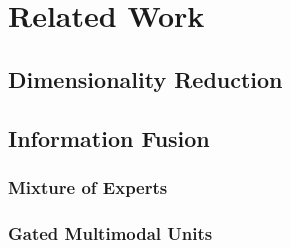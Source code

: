 \chapter{Related Work} \label{chap:relatedwork}

\section{Dimensionality Reduction}

\section{Information Fusion}

\subsection{Mixture of Experts}

\subsection{Gated Multimodal Units}